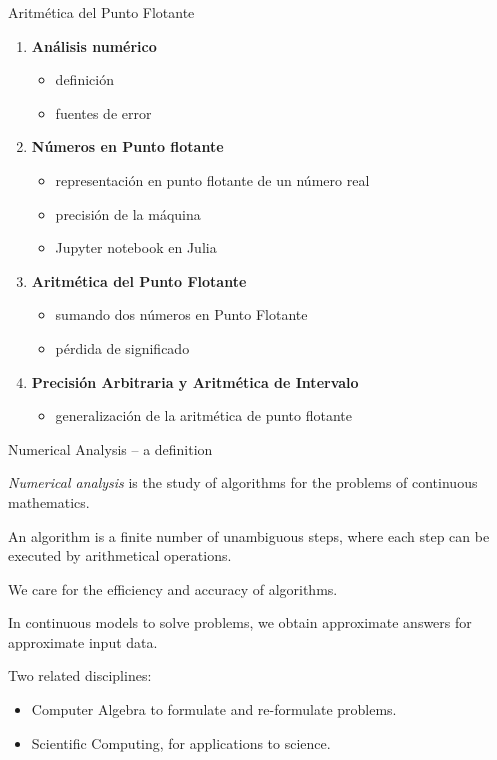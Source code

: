 \documentclass{beamer}
\begin{document}
\begin{frame}{Aritmética del Punto Flotante}
    \begin{enumerate}
        \item<1-> \textbf{Análisis numérico}
        \begin{itemize}
            \item<1-> definición
            \item<2-> fuentes de error
        \end{itemize}
        \item<3-> \textbf{Números en Punto flotante}
        \begin{itemize}
            \item representación en punto flotante de un número real 
            \item precisión de la máquina
            \item Jupyter notebook en Julia
        \end{itemize}
        \item<4-> \textbf{Aritmética del Punto Flotante}
        \begin{itemize}
            \item sumando dos números en Punto Flotante
            \item pérdida de significado
        \end{itemize}
        \item<5-> \textbf{Precisión Arbitraria y Aritmética de Intervalo}
        \begin{itemize}
            \item generalización de la aritmética de punto flotante
        \end{itemize}
    \end{enumerate}
\end{frame}


\begin{frame}{Numerical Analysis – a definition}
    \begin{tcolorbox}[colback=blue!5!white,colframe=blue!75!black,title=Definition (Nick Trefethen, SIAM News 1992)]
        \textit{Numerical analysis} is the study of algorithms for the problems of continuous mathematics.
    \end{tcolorbox}
    \vspace{1em}
    An algorithm is a finite number of unambiguous steps, where each step can be executed by arithmetical operations.

    We care for the efficiency and accuracy of algorithms.

    In continuous models to solve problems, we obtain approximate answers for approximate input data.

    Two related disciplines:
    \begin{itemize}
        \item Computer Algebra to formulate and re-formulate problems.
        \item Scientific Computing, for applications to science.
    \end{itemize}
\end{frame}
\end{document}
